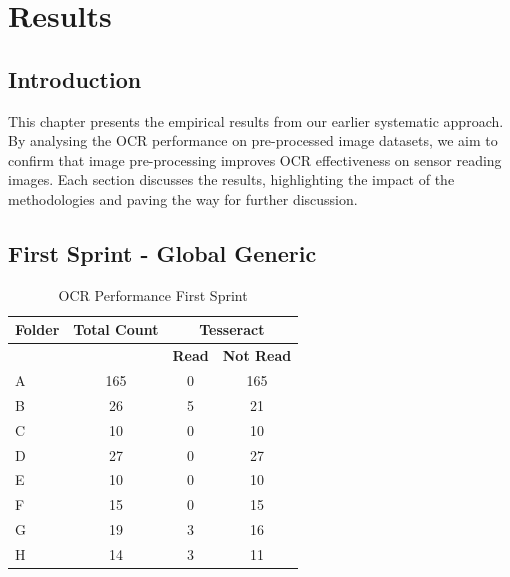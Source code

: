 \chapter{Results}
\label{chap:results}

\section{Introduction}

This chapter presents the empirical results from our earlier systematic approach. By analysing the OCR performance on pre-processed image datasets, we aim to confirm that image pre-processing improves OCR effectiveness on sensor reading images. Each section discusses the results, highlighting the impact of the methodologies and paving the way for further discussion.

\newpage
\section{First Sprint - Global Generic}

\begin{table}[h]
    \centering
    \caption{OCR Performance First Sprint}
    \label{tab:first_sprint_results}
    \begin{tabular}{|l|c|c|c|}
        \hline
        \textbf{Folder} & \textbf{Total Count} & \multicolumn{2}{c|}{\textbf{Tesseract}}                     \\
        \hline
                        &                      & \textbf{Read}                           & \textbf{Not Read} \\
        \hline
        A               & 165                  & 0                                       & 165               \\
        B               & 26                   & 5                                       & 21                \\
        C               & 10                   & 0                                       & 10                \\
        D               & 27                   & 0                                       & 27                \\
        E               & 10                   & 0                                       & 10                \\
        F               & 15                   & 0                                       & 15                \\
        G               & 19                   & 3                                       & 16                \\
        H               & 14                   & 3                                       & 11                \\
        \hline
    \end{tabular}
\end{table}

